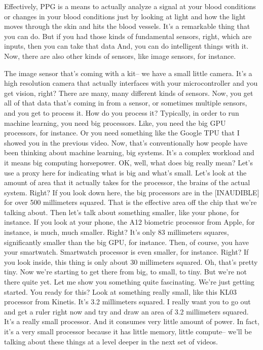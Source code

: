 Effectively, PPG is a means to actually analyze a signal at your blood conditions or changes in your blood conditions just by looking at light and how the light moves through the skin and hits the blood vessels.
It's a remarkable thing that you can do.
But if you had those kinds of fundamental sensors, right, which are inputs, then you can take that data And, you can do intelligent things with it.
Now, there are also other kinds of sensors, like image sensors, for instance.


The image sensor that's coming with a kit-- we have a small little camera.
It's a high resolution camera that actually interfaces with your microcontroller and you get vision, right?
There are many, many different kinds of sensors.
Now, you get all of that data that's coming in from a sensor, or sometimes multiple sensors, and you get to process it.
How do you process it?
Typically, in order to run machine learning, you need big processors.
Like, you need the big GPU processors, for instance.
Or you need something like the Google TPU that I showed you in the previous video.
Now, that's conventionally how people have been thinking about machine learning, big systems.
It's a complex workload and it means big computing horsepower.
OK, well, what does big really mean?
Let's use a proxy here for indicating what is big and what's small.
Let's look at the amount of area that it actually takes for the processor, the brains of the actual system.
Right?
If you look down here, the big processors are in the [INAUDIBLE]
for over 500 millimeters squared.
That is the effective area off the chip that we're talking about.
Then let's talk about something smaller, like your phone, for instance.
If you look at your phone, the A12 biometric processor from Apple, for instance, is much, much smaller.
Right?
It's only 83 millimeters squares, significantly smaller than the big GPU, for instance.
Then, of course, you have your smartwatch.
Smartwatch processor is even smaller, for instance.
Right?
If you look inside, this thing is only about 30 millimeters squared.
Oh, that's pretty tiny.
Now we're starting to get there from big, to small, to tiny.
But we're not there quite yet.
Let me show you something quite fascinating.
We're just getting started.
You ready for this?
Look at something really small, like this KL03 processor from Kinetis.
It's 3.2 millimeters squared.
I really want you to go out and get a ruler right now and try and draw an area of 3.2 millimeters squared.
It's a really small processor.
And it consumes very little amount of power.
In fact, it's a very small processor because it has little memory, little compute-- we'll be talking about these things at a level deeper in the next set of videos.
